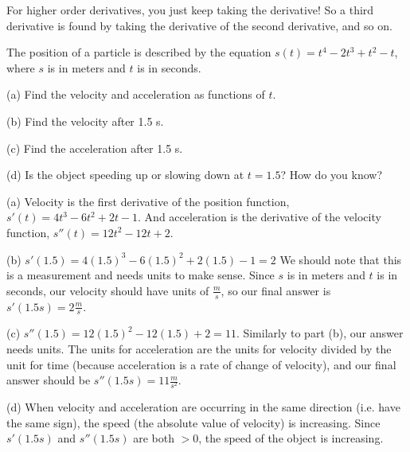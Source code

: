 For higher order derivatives, you just keep taking the derivative! So a third derivative is found by taking the derivative of the second derivative, and so on. 
\begin{Exercise}[title=Using Derivatives to Describe Motion, label=diffpoly2]
The position of a particle is described by the equation $s(t) = t^4-2t^3+t^2-t$, where $s$ is in meters and $t$ is in seconds. 

(a) Find the velocity and acceleration as functions of $t$.

(b) Find the velocity after 1.5 s. 

(c) Find the acceleration after 1.5 s.

(d) Is the object speeding up or slowing down at $t=1.5$? How do you know? 

\end{Exercise}
\begin{Answer}[ref=diffpoly2]
(a) Velocity is the first derivative of the position function, $s'(t) = 4t^3-6t^2+2t-1$. And acceleration is the derivative of the velocity function, $s''(t) = 12t^2-12t+2$. 

(b) $s'(1.5) = 4(1.5)^3-6(1.5)^2+2(1.5)-1 = 2$ We should note that this is a measurement and needs units to make sense. Since $s$ is in meters and $t$ is in seconds, our velocity should have units of $\frac{m}{s}$, so our final answer is $s'(1.5s) = 2\frac{m}{s}$. 

(c) $s''(1.5) = 12(1.5)^2-12(1.5)+2 = 11$. Similarly to part (b), our answer needs units. The units for acceleration are the units for velocity divided by the unit for time (because acceleration is a rate of change of velocity), and our final answer should be $s''(1.5s) = 11\frac{m}{s^2}$.

(d) When velocity and acceleration are occurring in the same direction (i.e. have the same sign), the speed (the absolute value of velocity) is increasing. Since $s'(1.5s)$ and $s''(1.5s)$ are both $>0$, the speed of the object is increasing. 
\end{Answer}